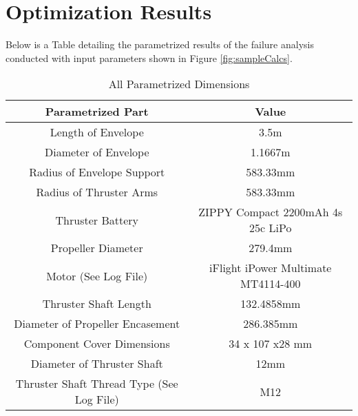 \documentclass[../main.tex]{subfiles}
\begin{document}
\chapter{Optimization Results}

Below is a Table detailing the parametrized results of the failure analysis conducted with input parameters shown in Figure \ref{fig:sampleCalcs}.

\begin{table}[H]
	\centering
	\caption{All Parametrized Dimensions}
	\label{tbl:allDimensions}
	\begin{tabular}{|c|c|}
		\hline
		\textbf{Parametrized Part}                                        & \textbf{Value}        \\ \hline
		Length of Envelope                                                &  3.5m                     \\ \hline
		Diameter of Envelope                                              &  1.1667m                     \\ \hline
		Radius of Envelope Support                                        &  583.33mm                     \\ \hline
		Radius of Thruster Arms                                           &  583.33mm                     \\ \hline
    	Thruster Battery                                                  &  ZIPPY Compact 2200mAh 4s 25c LiPo                    \\ \hline
		Propeller Diameter                                                &  279.4mm                     \\ \hline
		Motor (See Log File)                                              &  iFlight iPower Multimate MT4114-400                     \\ \hline
		Thruster Shaft Length                                             &  132.4858mm                     \\ \hline
		Diameter of Propeller Encasement                                  &  286.385mm                     \\ \hline
		Component Cover Dimensions                                        &  34 x 107 x28 mm                     \\ \hline
		Diameter of Thruster Shaft                                        &  12mm                     \\ \hline
		Thruster Shaft Thread Type (See Log File)                         &  M12                     \\ \hline

\end{tabular}
\end{table}
\end{document}
